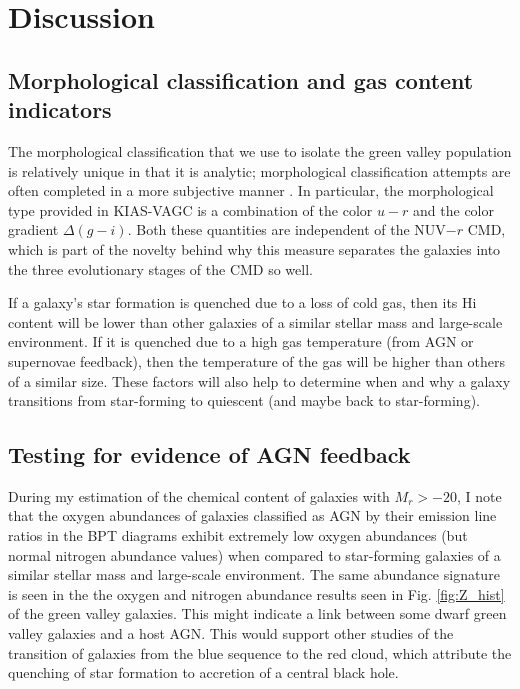 

\section[Discussion]{Discussion}


\subsection{Morphological classification and gas content indicators}


The morphological classification that we use to isolate the green valley 
population is relatively unique in that it is analytic; morphological 
classification attempts are often completed in a more subjective manner 
\citep[such as the GalaxyZoo,][]{Lintott11}.  In particular, the 
morphological type provided in KIAS-VAGC is a combination of the color $u-r$ and 
the color gradient $\Delta (g-i)$.  Both these quantities are independent of the 
NUV$-r$ CMD, which is part of the novelty behind why this measure separates the 
galaxies into the three evolutionary stages of the CMD so well.

If a galaxy's star formation is quenched due to a loss of 
cold gas, then its H{\sc i} content will be lower than other galaxies of a 
similar stellar mass and large-scale environment.  If it is quenched due to a 
high gas temperature (from AGN or supernovae feedback), then the temperature of 
the gas will be higher than others of a similar size.  These factors will also 
help to determine when and why a galaxy transitions from star-forming to 
quiescent (and maybe back to star-forming).


\subsection{Testing for evidence of AGN feedback}

During my estimation of the chemical content of galaxies with $M_r > -20$, I 
note that the oxygen abundances of galaxies classified as AGN by their 
emission line ratios in the BPT diagrams exhibit extremely low oxygen abundances 
(but normal nitrogen abundance values) when compared to star-forming galaxies of 
a similar stellar mass and large-scale environment.  The same abundance 
signature is seen in the the oxygen and nitrogen abundance results seen in Fig. 
\ref{fig:Z_hist} of the green valley galaxies.  This might indicate a 
link between some dwarf green valley galaxies and a host AGN.  This 
would support other studies of the transition of galaxies from the blue sequence 
to the red cloud, which attribute the quenching of star formation to accretion 
of a central black hole.

